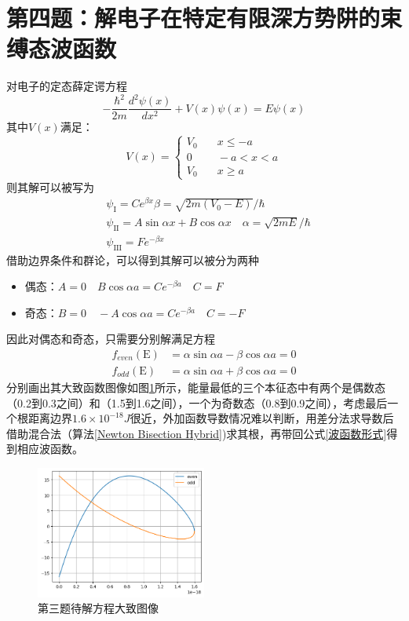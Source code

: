 \documentclass[11pt]{article}
\begin{document}
\section{第四题：解电子在特定有限深方势阱的束缚态波函数}
对电子的定态薛定谔方程
\begin{equation}
    -\frac{\hbar^{2}}{2m}\frac{d^{2}\psi\left(x\right)}{dx^{2}}+V(x)\psi(x)=E\psi(x)
\end{equation}
其中$V(x)$满足：
\begin{equation}
    V(x)=\begin{cases}V_0&\quad x \le -a\\0&\quad-a <x <a\\V_0&\quad x \ge a\end{cases}
\end{equation}
则其解可以被写为
\begin{equation}
\label{波函数形式}
    \begin{aligned}
&\psi_{\mathrm{I}}=Ce^{\beta x} \beta=\sqrt{2m(V_{0}-E)}/\hbar  \\
&\psi_{\mathrm{II}}=A\sin\alpha x+B\cos\alpha x\quad\alpha=\sqrt{2mE}/\hbar \\
&\psi_{\mathrm{III}}=Fe^{-\beta x}
\end{aligned}
\end{equation}
借助边界条件和群论，可以得到其解可以被分为两种
\begin{itemize}
    \item 偶态：$A=0 \quad B\cos\alpha a=Ce^{-\beta a} \quad C=F$
    \item 奇态：$B=0 \quad -A\cos\alpha a=Ce^{-\beta a} \quad C=-F$
\end{itemize}
因此对偶态和奇态，只需要分别解满足方程
\begin{equation}
\begin{aligned}
    f_{even}(\mathrm{E})&=\alpha\sin\alpha a-\beta\cos\alpha a=0 \\
    f_{odd}(\mathrm{E})&=\alpha\sin\alpha a+\beta\cos\alpha a=0
\end{aligned}
\end{equation}
分别画出其大致函数图像如图\ref{fig:第三题待解方程大致图像}所示，能量最低的三个本征态中有两个是偶数态（0.2到0.3之间）和（1.5到1.6之间），一个为奇数态（0.8到0.9之间），考虑最后一个根距离边界$1.6\times 10^{-18}J$很近，外加函数导数情况难以判断，用差分法求导数后借助混合法（算法\ref{Newton Bisection Hybrid})求其根，再带回公式\ref{波函数形式}得到相应波函数。
\begin{figure}
    \centering
    \includegraphics[width=0.5\textwidth]{第三题待解方程大致图像.png}
    \caption{第三题待解方程大致图像}
    \label{fig:第三题待解方程大致图像}
\end{figure}
\end{document}
